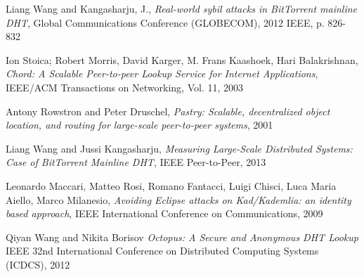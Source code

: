 \begin{thebibliography}{99}
Liang Wang and Kangasharju, J.,
\textit{Real-world sybil attacks in BitTorrent mainline DHT},
Global Communications Conference (GLOBECOM), 2012 IEEE, p. 826-832

  Ion Stoica; Robert Morris, David Karger, M. Frans Kaashoek, Hari Balakrishnan,
  \textit{Chord: A Scalable Peer-to-peer Lookup Service for Internet
  Applications},
  IEEE/ACM Transactions on Networking, Vol. 11, 2003

    Antony Rowstron and Peter Druschel,
    \textit{Pastry: Scalable, decentralized object location, and routing for
    large-scale peer-to-peer systems}, 2001

  Liang Wang and Jussi Kangasharju,
  \textit{Measuring Large-Scale Distributed Systems: Case of BitTorrent
  Mainline DHT}, 
  IEEE Peer-to-Peer, 2013

  Leonardo Maccari, Matteo Rosi, Romano Fantacci, Luigi Chisci, Luca Maria
  Aiello, Marco Milanesio,
  \textit{Avoiding Eclipse attacks on Kad/Kademlia: an identity based approach},
   IEEE International Conference on Communications, 2009

   Qiyan Wang and Nikita Borisov
   \textit{Octopus: A Secure and Anonymous DHT Lookup}
   IEEE 32nd International Conference on Distributed Computing Systems (ICDCS), 2012
\end{thebibliography}


